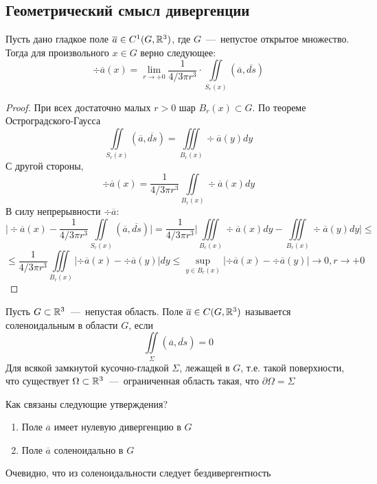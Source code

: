 \subsection{Геометрический смысл дивергенции}
\begin{theorem}
    Пусть дано гладкое поле $\overline{a} \in C^1(G, \mathbb{R}^3)$, где $G$~---~непустое открытое множество. Тогда для произвольного $x \in G$ верно следующее: \[\div \overline{a}(x) = \lim\limits_{r \rightarrow +0} \dfrac{1}{4/3\pi r^3} \cdot \iint\limits_{S_r(x)}(\overline{a}, \overline{ds})\]
\end{theorem}
\begin{proof}
    При всех достаточно малых $r > 0$ шар $B_r(x) \subset G$. По теореме Остроградского-Гаусса \[\iint\limits_{S_r(x)} (\overline{a}, \overline{ds}) = \iiint\limits_{B_r(x)}\div \overline{a}(y)dy\]
    С другой стороны, \[\div \overline{a}(x) = \dfrac{1}{4/3\pi r^3}\iint\limits_{B_r(x)}\div \overline{a}(x)dy\]
    В силу непрерывности $\div \overline{a}$: \[\biggr|\div\overline{a}(x) - \dfrac{1}{4/3 \pi r^3}\iint\limits_{S_r(x)}(\overline{a}, \overline{ds})\biggr| = \dfrac{1}{4/3 \pi r^3}\biggr| \iiint\limits_{B_r(x)}\div\overline{a}(x)dy - \iiint\limits_{B_r(x)}\div\overline{a}(y)dy\biggr| \leq \]\[\leq \dfrac{1}{4/3 \pi r^3}\iiint\limits_{B_r(x)}|\div\overline{a}(x) - \div\overline{a}(y)|dy \leq \sup\limits_{y \in B_r(x)}|\div\overline{a}(x) - \div\overline{a}(y)| \rightarrow 0, r \rightarrow +0\]
\end{proof}
\begin{definition}
    Пусть $G \subset \mathbb{R}^3$~---~непустая область. Поле $\overline{a} \in C(G, \mathbb{R}^3)$ называется соленоидальным в области $G$, если \[\iint\limits_\Sigma (\overline{a}, \overline{ds}) = 0\]
    Для всякой замкнутой кусочно-гладкой $\Sigma$, лежащей в $G$, т.е. такой поверхности, что существует $\Omega \subset \mathbb{R}^3$~---~ограниченная область такая, что $\partial \Omega = \Sigma$
\end{definition}
\begin{question}
    Как связаны следующие утверждения?
    \begin{enumerate}
        \item Поле $\overline{a}$ имеет нулевую дивергенцию в $G$
        \item Поле $\overline{a}$ соленоидально в $G$
    \end{enumerate}
\end{question}
\begin{lemma}
    Очевидно, что из соленоидальности следует бездивергентность
\end{lemma}
